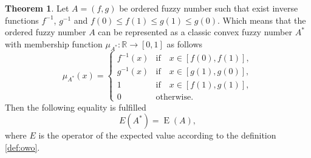 \documentclass[review]{elsarticle}
\theoremstyle{definition}
\theoremstyle{theorem}
\newtheorem{theorem}{Theorem}
\DeclareMathOperator*{\E}{E}
\begin{document}
\begin{theorem}
Let $A=(f,g)$ be ordered fuzzy number such that exist inverse functions $f^{-1}$, $g^{-1}$ and $f(0)\leq f(1)\leq g(1)\leq g(0)$. Which means that the ordered fuzzy number $ A $ can be represented as a classic convex fuzzy number $ A^* $ with membership function $ \mu_{A^*} \colon \mathbb{R} \to [0,1] $ as follows
\begin{equation}
\mu_{A^*}(x)=\left\{
\begin{array}{ll}
f^{-1}(x) &\text{if}\quad x\in [f(0),f(1)],\\
g^{-1}(x) &\text{if}\quad x\in [g(1),g(0)],\\
1 & \text{if}\quad x\in [f(1),g(1)],\\
0 & \text{otherwise.}
\end{array}
\right.
\end{equation}
Then the following equality is fulfilled
\begin{equation}
\label{eq:tw}
E(A^*)=\E(A),
\end{equation}
where $E$ is the operator of the expected value according to the definition \ref{def:owo}.   
\end{theorem}
\end{document}

